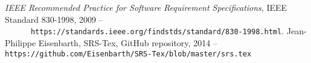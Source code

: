 
\begingroup
\renewcommand{\chapter}[2]{}%

\begin{thebibliography}{1}
    \textit{IEEE Recommended Practice for Software Requirement
      Specifications}, IEEE Standard 830-1998, 2009 -- \nolinkurl{
      https://standards.ieee.org/findstds/standard/830-1998.html}.
    Jean-Philippe Eisenbarth, SRS-Tex, GitHub repository, 2014 -- 
      \nolinkurl{https://github.com/Eisenbarth/SRS-Tex/blob/master/srs.tex}
\end{thebibliography}

\begingroup
